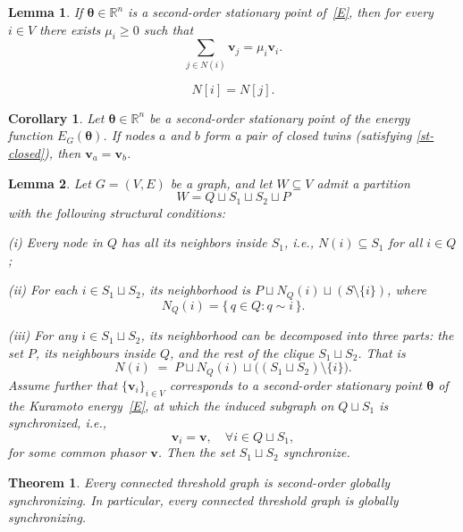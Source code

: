 \documentclass[10pt,a4paper]{amsart}
\newtheorem{theorem}{Theorem}
\newtheorem{lemma}{Lemma}
\newtheorem{corollary}{Corollary}
\begin{document}
\begin{lemma}\label{stable-eq}
If $\boldsymbol{\theta}\in\mathbb R^n$ is a second-order stationary point of~\eqref{E},
then for every $i\in V$ there exists $\mu_i\ge 0$ such that $$\sum_{j\in N(i)} \boldsymbol{v}_j = \mu_i \boldsymbol{v}_i.$$
\end{lemma}

\begin{equation}\label{st-closed}
N[i] = N[j].\end{equation}

\begin{corollary}\label{cor:twins-sync}
Let $\boldsymbol{\theta}\in\mathbb R^n$ be a second-order stationary point of the energy function $E_G(\boldsymbol{\theta})$. 
If nodes $a$ and $b$ form a pair of closed twins (satisfying \eqref{st-closed}), then $\boldsymbol{v}_a = \boldsymbol{v}_b$.
\end{corollary}

\begin{lemma}\label{lemma:pendant}
Let $G=(V,E)$ be a graph, and let $W \subseteq V$ admit a partition
\[ W = Q \sqcup S_1 \sqcup S_2 \sqcup P\]
with the following structural conditions:

(i) Every node in $Q$ has all its neighbors inside $S_1$, 
    i.e., $N(i) \subseteq S_1$ for all $i \in Q$;

(ii) For each $i \in S_1 \sqcup S_2$, its neighborhood is 
    $P \sqcup N_Q(i) \sqcup (S \setminus \{i\})$, 
    where $$N_Q(i) = \{\, q \in Q : q \sim i \,\}.$$
    
(iii) For any \( i \in S_1 \sqcup S_2 \), its neighborhood can be decomposed into three parts: the set \(P\), its neighbours inside \(Q\), and the rest of the clique \(S_1 \sqcup S_2\).  
That is
\[
N(i) \;=\; P \sqcup N_Q(i) \sqcup \bigl((S_1 \sqcup S_2)\setminus \{i\}\bigr).
\]
Assume further that \( \{\boldsymbol{v}_i\}_{i\in V} \) corresponds to a second-order stationary point
\( \boldsymbol{\theta} \) of the Kuramoto energy~\eqref{E}, at which the induced subgraph on
\( Q \sqcup S_1 \) is synchronized, i.e.,
\[
\boldsymbol{v}_i = \boldsymbol{v}, \quad \forall i \in Q \sqcup S_1 ,
\]
for some common phasor \( \boldsymbol{v} \).
Then the set $S_1\sqcup S_2$ synchronize.
\end{lemma}

\begin{theorem}\label{main}
Every connected threshold graph is second-order globally synchronizing. In particular, every connected threshold graph is globally synchronizing.
\end{theorem}
\end{document}
